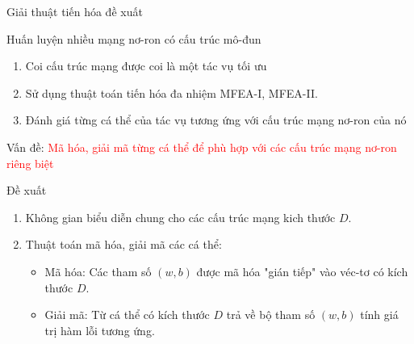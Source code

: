 	\begin{frame}{Giải thuật tiến hóa đề xuất}
	    \begin{itemize}
		    \begin{block}{Huấn luyện nhiều mạng nơ-ron có cấu trúc mô-đun}
		        \begin{enumerate}
		            \setlength\itemsep{0.01em}
		            \item Coi cấu trúc mạng được coi là một tác vụ tối ưu
		            \item Sử dụng thuật toán tiến hóa đa nhiệm MFEA-I, MFEA-II.
		            \item Đánh giá từng cá thể của tác vụ tương ứng với cấu trúc mạng nơ-ron của nó
		        \end{enumerate}
		        Vấn đề: \textcolor{red}{Mã hóa, giải mã từng cá thể để phù hợp với các cấu trúc mạng nơ-ron riêng biệt}
		    \end{block}
		    \begin{block}{Đề xuất}
		        \begin{enumerate}
		            \setlength\itemsep{0.01em}
		            \item Không gian biểu diễn chung cho các cấu trúc mạng kich thước $D$.
		            \item Thuật toán mã hóa, giải mã các cá thể:
		            \begin{itemize}
		                \setlength\itemsep{0.01em}
		                \item Mã hóa: Các tham số $(w,b)$ được mã hóa "gián tiếp" vào véc-tơ có kích thước $D$.
		                \item Giải mã: Từ cá thể có kích thước $D$ trả về bộ tham số $(w,b)$ tính giá trị hàm lỗi tương ứng.
		            \end{itemize}
		        \end{enumerate}
		    \end{block}
		\end{itemize}
	\end{frame}
